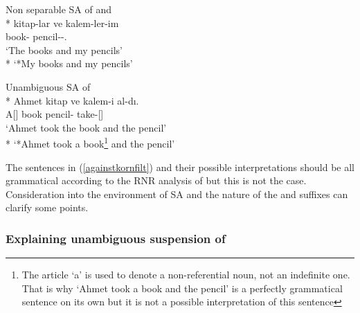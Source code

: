 \begin{exe}
    \ex \label{againstkornfilt}
    \begin{xlist}
        \ex Non separable SA of {\Pl} and {\Poss}\\*
        \gll kitap-lar ve kalem-ler-im \\ 
        book-{\Pl} {\And} pencil-{\Pl}-{\Poss}.{\Fsg} \\
        \glt `The books and my pencils' \\*
        `*My books and my pencils'
        
        \ex Unambiguous SA of {\Acc}\\*
        \gll Ahmet kitap ve kalem-i al-dı. \\ 
        A[{\Nom}] book {\And} pencil-{\Acc} take-{\Pst}[{\Tsg}] \\
        \glt `Ahmet took the book and the pencil' \\*
        `*Ahmet took a book\footnote{The article `a' is used to denote a non-referential noun, not an indefinite one. That is why `Ahmet took a book and the pencil' is a perfectly grammatical sentence on its own but it is not a possible interpretation of this sentence} and the pencil'
    \end{xlist}
\end{exe}

The sentences in (\ref{againstkornfilt}) and their possible interpretations should be all grammatical according to the RNR analysis of \cite{kornfilt2012revisiting} but this is not the case. Consideration into the environment of SA and the nature of the {\Pl} and {\Poss} suffixes can clarify some points.


\subsubsection{Explaining unambiguous suspension of {\Case}}

